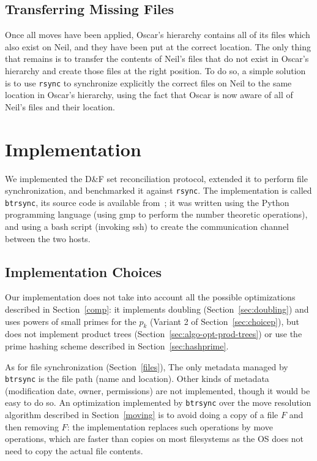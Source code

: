 \documentclass[11pt]{llncs}
\newcommand{\btrsync}{\texttt{btrsync}\xspace}
\newcommand{\rsync}{\texttt{rsync}\xspace}
\begin{document}
\subsection{Transferring Missing Files}
\label{transferring}

Once all moves have been applied, Oscar's hierarchy contains all of its files
which also exist on Neil, and they have been put at the correct location. The
only thing that remains is to transfer the contents of Neil's files that do not
exist in Oscar's hierarchy and create those files at the right position. To do
so, a simple solution is to use \rsync to synchronize explicitly the correct
files on Neil to the same location in Oscar's hierarchy, using the fact that
Oscar is now aware of all of Neil's files and their location.

\section{Implementation}
\label{program}

We implemented the D\&F set reconciliation protocol, extended it to perform file
synchronization, and benchmarked it against \rsync. The implementation is called
\btrsync, its source code is available from~\cite{Robin}; it was written using
the Python programming language (using {\sf gmp} to perform the number theoretic
operations), and using a bash script (invoking ssh) to create the communication
channel between the two hosts.

\subsection{Implementation Choices}

Our implementation does not take into account all the possible optimizations
described in Section~\ref{comp}: it implements doubling
(Section~\ref{sec:doubling}) and uses powers of small primes for the $p_k$
(Variant 2 of Section~\ref{sec:choicep}), but does not implement product trees
(Section~\ref{sec:algo-opt-prod-trees}) or use the prime hashing scheme
described in Section~\ref{sec:hashprime}.

As for file synchronization (Section~\ref{files}), The only metadata managed by
\btrsync is the file path (name and location). Other kinds of metadata
(modification date, owner, permissions) are not implemented, though it would be
easy to do so. An optimization implemented by \btrsync over the move resolution algorithm described in Section~\ref{moving} is to avoid doing a copy of a file $F$ and then removing $F$: the implementation replaces such operations by move operations, which are faster than copies on most filesystems as the OS does not need to copy the actual file contents.
\end{document}
